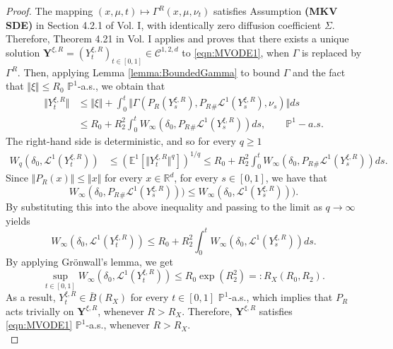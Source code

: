 \documentclass{article}
\newcommand{\R}{\mathbb{R}}
\begin{document}
\begin{appendices}
\begin{proof}
The mapping $(x,\mu,t)\mapsto \Gamma^R(x,\mu,\nu_t)$ satisfies Assumption \textbf{(MKV SDE)} in Section 4.2.1 of \cite{carmona2018probabilistic} Vol. I, with identically zero diffusion coefficient $\Sigma$. Therefore, Theorem 4.21 in \cite{carmona2018probabilistic} Vol. I applies and proves that there exists a unique solution $\bm{Y}^{\xi,R}=(Y^{\xi,R}_t)_{t\in[0,1]}\in \mathscr{C}^{1,2,d}$ to \eqref{eqn:MVODE1}, when $\Gamma$ is replaced by $\Gamma^R$. Then, applying Lemma \ref{lemma:BoundedGamma} to bound $\Gamma$ and the fact that $\Vert \xi\Vert \le R_0$ $\mathbb P^1$-a.s., we obtain that
\begin{align*}
    \Vert Y^{\xi,R}_t\Vert &\le \Vert \xi\Vert+ \int_0^t\Vert \Gamma(P_R(Y^{\xi,R}_s), P_R{}_\#\mathcal L^1(Y^{\xi,R}_s), \nu_s)\Vert ds
    \\&\le R_0+ R_2^2\int_0^tW_\infty(\delta_0, P_R{}_\#\mathcal L^1(Y^{\xi,R}_s))ds, \qquad \mathbb P^1-a.s.
\end{align*}
The right-hand side is deterministic, and so for every $q\ge 1$
\begin{align*}
      W_q(\delta_0,\mathcal L^1(Y^{\xi,R}_t))& \le \left(\mathbb E^1[\Vert Y^{\xi,R}_t\Vert^q]\right)^{1/q}\le R_0+ R_2^2\int_0^t W_\infty(\delta_0, P_R{}_\#\mathcal L^1(Y^{\xi,R}_s))ds.
\end{align*}
Since $\Vert P_R(x)\Vert \le \Vert x\Vert$ for every $x\in \R^d$, for every $s\in[0,1]$, we have that
\[
W_\infty(\delta_0,P_R{}_\#\mathcal L^1(Y^{\xi,R}_s)))\le W_\infty(\delta_0,\mathcal L^1(Y^{\xi,R}_s))).
\]
By substituting this into the above inequality and passing to the limit as $q \to \infty$ yields
\[
W_\infty(\delta_0,\mathcal L^1(Y^{\xi,R}_t))  
    \le R_0+ R_2^2\int_0^tW_\infty(\delta_0,\mathcal L^1(Y^{\xi,R}_s))ds.
\]
By applying Gr\"onwall's lemma, we get
\[
\sup_{t\in[0,1]}W_\infty(\delta_0,\mathcal L^1(Y^{\xi,R}_t)) \le R_0\exp(R_2^2)=:R_X(R_0,R_2). 
\]
 As a result, $Y^{\xi,R}_t\in\bar B(R_X)$ for every $t\in[0,1]$ $\mathbb P^1$-a.s., which implies that $P_R$ acts trivially on $\bm{Y}^{\xi,R}$, whenever $R>R_X$. Therefore, $\bm{Y}^{\xi,R}$ satisfies \eqref{eqn:MVODE1} $\mathbb P^1$-a.s., whenever $R>R_X$.\\


\end{proof}
\end{appendices}
\end{document}
